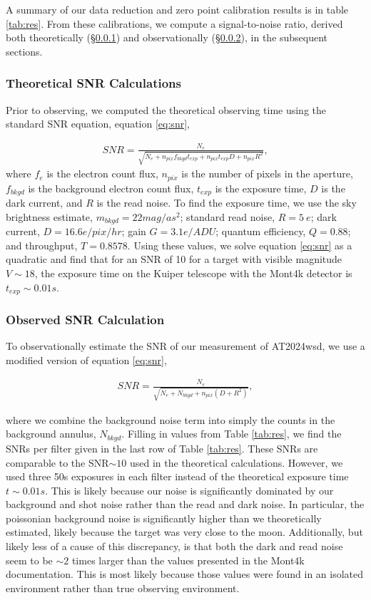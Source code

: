 \documentclass{aastex631}
\begin{document}
A summary of our data reduction and zero point calibration results is in table \ref{tab:res}. From these calibrations, we compute a signal-to-noise ratio, derived both theoretically (\S\ref{sec:snr_theory}) and observationally (\S\ref{sec:snr_obs}), in the subsequent sections.  

\subsubsection{Theoretical SNR Calculations}\label{sec:snr_theory}
Prior to observing, we computed the theoretical observing time using the standard SNR equation, equation \ref{eq:snr},

\begin{align}
  SNR = \frac{N_e}{\sqrt{N_e + n_{pix}f_{bkgd}t_{exp} + n_{pix}t_{exp}D + n_{pix}R^2 }}, \label{eq:snr}
\end{align}
where $f_e$ is the electron count flux, $n_{pix}$ is the number of pixels in the aperture, $f_{bkgd}$ is the background electron count flux, $t_{exp}$ is the exposure time, $D$ is the dark current, and $R$ is the read noise. To find the exposure time, we use the sky brightness estimate, $m_{bkgd}=22 mag/as^2$; standard read noise, $R=5~e$; dark current, $D=16.6 e/pix/hr$; gain $G=3.1 e/ADU$; quantum efficiency, $Q=0.88$; and throughput, $T=0.8578$. Using these values, we solve equation \ref{eq:snr} as a quadratic and find that for an SNR of 10 for a target with visible magnitude $V\sim18$, the exposure time on the Kuiper telescope with the Mont4k detector is $t_{exp} \sim 0.01s$. 

\subsubsection{Observed SNR Calculation}\label{sec:snr_obs}
To observationally estimate the SNR of our measurement of AT2024wsd, we use a modified version of equation \ref{eq:snr},

\begin{align}
  SNR = \frac{N_e}{\sqrt{N_e+N_{bkgd}+n_{pix}\left(D + R^2\right)}},
\end{align}

\noindent where we combine the background noise term into simply the counts in the background annulus, $N_{bkgd}$. Filling in values from Table \ref{tab:res}, we find the SNRs per filter given in the last row of Table \ref{tab:res}. These SNRs are comparable to the SNR$\sim10$ used in the theoretical calculations. However, we used three 50s exposures in each filter instead of the theoretical exposure time $t\sim0.01s$. This is likely because our noise is significantly dominated by our background and shot noise rather than the read and dark noise. In particular, the poissonian background noise is significantly higher than we theoretically estimated, likely because the target was very close to the moon. Additionally, but likely less of a cause of this discrepancy, is that both the dark and read noise seem to be $\sim2$ times larger than the values presented in the Mont4k documentation. This is most likely because those values were found in an isolated environment rather than true observing environment.  
\end{document}

